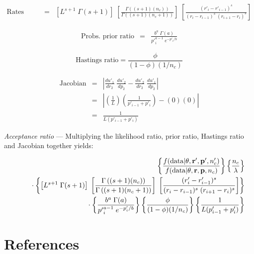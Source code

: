 \documentclass[12pt]{article}
\newcommand{\ncat}{n_c}
\begin{document}
\begin{eqnarray*}
\mbox{Rates prior ratio} 
  & = & \left[ L^{s+1} \; \Gamma(s+1)\right] \; 
  \left[ \frac{\Gamma\left( (s+1) (\ncat) \right)}{\Gamma\left( (s+1) (\ncat + 1) \right)} \right] \;
  \left[ \frac{(r'_i - r'_{i-1})^s}{(r_i - r_{i-1})^s \; (r_{i+1} - r_i)^s} \right]
\end{eqnarray*}

\begin{eqnarray*}
\mbox{Probs. prior ratio} & = & \frac{ b^a \; \Gamma(a) }{ {p'}_i^{a-1} \; e^{-p'_i/b} } 
\end{eqnarray*}

\[ \mbox{Hastings ratio} = \frac{\phi}{(1-\phi)(1/\ncat)} \]

\begin{eqnarray*}
\mbox{Jacobian} & = & \left| \frac{d u'_1}{d r_2} \; \frac{d u'_2}{d p_2} - \frac{d u'_2}{d r_2} \; \frac{d u'_1}{d p_2} \right| \\
& = & \left| \left( \frac{1}{L} \right) \left( \frac{1}{p'_{i-1} + p'_i} \right) - (0)(0) \right| \\
& = & \frac{1}{L(p'_{i-1} + p'_i)}
\end{eqnarray*}

{\em Acceptance ratio} --- Multiplying the likelihood ratio, prior ratio, Hastings ratio and Jacobian together yields:

\begin{eqnarray*}
& & \left\{ 
  \frac{f(\mbox{data} | {\bf \theta}, {\bf r}', {\bf p}', \ncat')}{f(\mbox{data} | {\bf \theta}, {\bf r}, {\bf p}, \ncat)} 
\right\}
\left\{ 
  \frac{\ncat}{\lambda} 
\right\} \\
& & \rule{.2in}{.0in} \cdot 
\left\{ 
  \left[ L^{s+1} \; \Gamma(s+1)\right] \; 
  \left[ \frac{\Gamma\left( (s+1) (\ncat) \right)}{\Gamma\left( (s+1) (\ncat + 1) \right)} \right] \;
  \left[ \frac{(r'_i - r'_{i-1})^s}{(r_i - r_{i-1})^s \; (r_{i+1} - r_i)^s} \right]
\right\} \\
& & \rule{.2in}{.0in} \cdot 
\left\{ 
  \frac{ b^a \; \Gamma(a) }{ {p'}_i^{a-1} \; e^{-p'_i/b} } 
\right\} 
\left\{ 
  \frac{\phi}{(1-\phi)(1/\ncat)} 
\right\}
\left\{ 
  \frac{1}{L(p'_{i-1} + p'_i)} 
\right\}
\end{eqnarray*}

\section{References}
\renewcommand{\bibsection}{}

\end{document}
